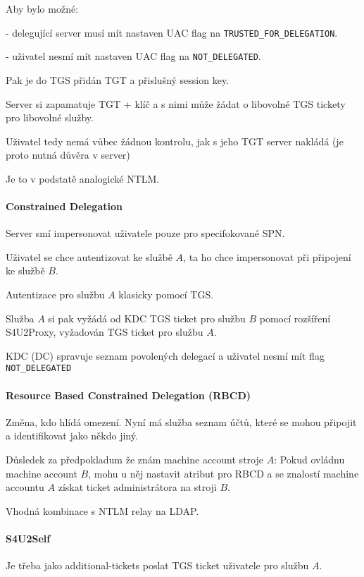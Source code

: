 \documentclass[10pt,a4paper]{article}
\begin{document}
Aby bylo možné:

- delegující server musí mít nastaven UAC flag na \texttt{TRUSTED\_FOR\_DELEGATION}.

- uživatel nesmí mít nastaven UAC flag na \texttt{NOT\_DELEGATED}.

Pak je do TGS přidán TGT a přislušný session key.

Server si zapamatuje TGT + klíč a s nimi může žádat o libovolné TGS tickety pro libovolné služby.

Uživatel tedy nemá vůbec žádnou kontrolu, jak s jeho TGT server nakládá (je proto nutná důvěra v server)

Je to v podstatě analogické NTLM.


\paragraph{Constrained Delegation} Server smí impersonovat uživatele pouze pro specifokované SPN.

Uživatel se chce autentizovat ke službě $ A $, ta ho chce impersonovat při připojení ke službě $ B $.

Autentizace pro službu $ A $ klasicky pomocí TGS.

Služba $ A $ si pak vyžádá od KDC TGS ticket pro službu $ B $ pomocí rozšíření S4U2Proxy, vyžadován TGS ticket pro službu $ A $.

KDC (DC) spravuje seznam povolených delegací a uživatel nesmí mít flag \texttt{NOT\_DELEGATED}

\paragraph{Resource Based Constrained Delegation (RBCD)}

Změna, kdo hlídá omezení. Nyní má služba seznam účtů, které se mohou připojit a identifikovat jako někdo jiný.


Důsledek za předpokladum že znám machine account stroje $ A $:
Pokud ovládnu machine account $ B $, mohu u něj nastavit atribut pro RBCD a se znalostí machine accountu $ A $ získat ticket administrátora na stroji $ B $.

Vhodná kombinace s NTLM relay na LDAP.

\paragraph{S4U2Self}

Je třeba jako additional-tickets poslat TGS ticket uživatele pro službu $ A $.
\end{document}
